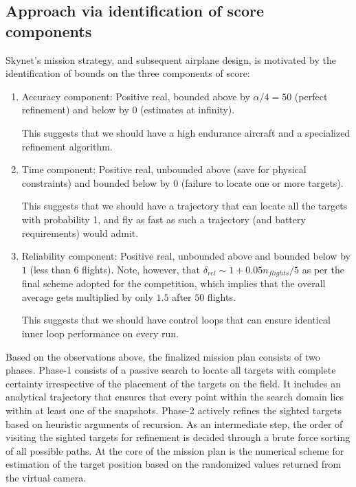 \subsection{Approach via identification of score components}
Skynet's mission strategy, and subsequent airplane design, is motivated by the identification of bounds on the three components of score:

\begin{enumerate}
\item Accuracy component: Positive real, bounded above by $\alpha/4 = 50$ (perfect refinement) and below by $0$ (estimates at infinity). 

This suggests that we should have a high endurance aircraft and a specialized refinement algorithm.

\item Time component: Positive real, unbounded above (save for physical constraints) and bounded below by $0$ (failure to locate one or more targets).

This suggests that we should have a trajectory that can locate all the targets with probability 1, and fly as fast as such a trajectory (and battery requirements) would admit.

\item Reliability component: Positive real, unbounded above  and bounded below by $1$ (less than 6 flights). Note, however, that $\delta_{rel} \sim 1 + 0.05 n_{flights}/5$ as per the final scheme adopted for the competition, which implies that the overall average gets multiplied by only $1.5$ after $50$ flights. 

This suggests that we should have control loops that can ensure identical inner loop performance on every run.

\end{enumerate}

Based on the observations above, the finalized mission plan consists of two phases. Phase-1 consists of a passive search to locate all targets with complete certainty irrespective of the placement of the targets on the field. It includes an analytical trajectory that ensures that every point within the search domain lies within at least one of the snapshots. Phase-2 actively refines the sighted targets based on heuristic arguments of recursion. As an intermediate step, the order of visiting the sighted targets for refinement is decided through a brute force sorting of all possible paths.
At the core of the mission plan is the numerical scheme for estimation of the target position based on the randomized values returned from the virtual camera. 

